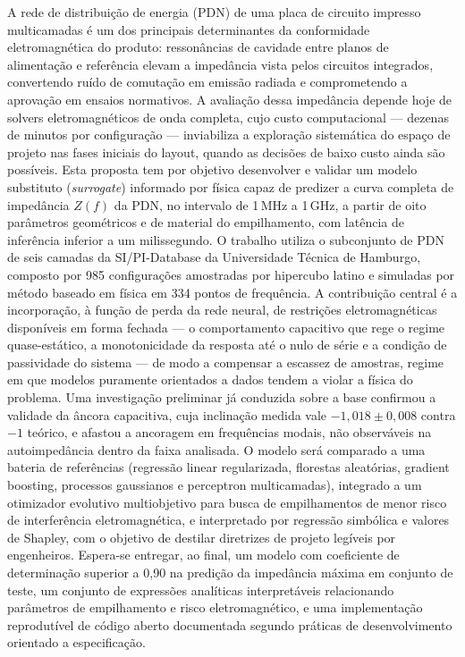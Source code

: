 \begin{resumo}

\noindent %
A rede de distribuição de energia (PDN) de uma placa de circuito impresso
multicamadas é um dos principais determinantes da conformidade eletromagnética
do produto: ressonâncias de cavidade entre planos de alimentação e referência
elevam a impedância vista pelos circuitos integrados, convertendo ruído de
comutação em emissão radiada e comprometendo a aprovação em ensaios normativos.
A avaliação dessa impedância depende hoje de solvers eletromagnéticos de onda
completa, cujo custo computacional — dezenas de minutos por configuração —
inviabiliza a exploração sistemática do espaço de projeto nas fases iniciais do
layout, quando as decisões de baixo custo ainda são possíveis. Esta proposta
tem por objetivo desenvolver e validar um modelo substituto (\textit{surrogate})
informado por física capaz de predizer a curva completa de impedância
$Z(f)$ da PDN, no intervalo de 1\,MHz a 1\,GHz, a partir de oito parâmetros
geométricos e de material do empilhamento, com latência de inferência inferior
a um milissegundo. O trabalho utiliza o subconjunto de PDN de seis camadas da
SI/PI-Database da Universidade Técnica de Hamburgo, composto por 985
configurações amostradas por hipercubo latino e simuladas por método baseado em
física em 334 pontos de frequência. A contribuição central é a incorporação, à
função de perda da rede neural, de restrições eletromagnéticas disponíveis em
forma fechada — o comportamento capacitivo que rege o regime quase-estático, a
monotonicidade da resposta até o nulo de série e a condição de passividade do
sistema — de modo a compensar a escassez de amostras, regime em que modelos
puramente orientados a dados tendem a violar a física do problema. Uma
investigação preliminar já conduzida sobre a base confirmou a validade da âncora
capacitiva, cuja inclinação medida vale $-1{,}018 \pm 0{,}008$ contra $-1$
teórico, e afastou a ancoragem em frequências modais, não observáveis na
autoimpedância dentro da faixa analisada. O modelo será comparado a uma bateria de
referências (regressão linear regularizada, florestas aleatórias, gradient
boosting, processos gaussianos e perceptron multicamadas), integrado a um
otimizador evolutivo multiobjetivo para busca de empilhamentos de menor risco
de interferência eletromagnética, e interpretado por regressão simbólica e
valores de Shapley, com o objetivo de destilar diretrizes de projeto legíveis
por engenheiros. Espera-se entregar, ao final, um modelo com coeficiente de
determinação superior a 0,90 na predição da impedância máxima em conjunto de
teste, um conjunto de expressões analíticas interpretáveis relacionando
parâmetros de empilhamento e risco eletromagnético, e uma implementação
reprodutível de código aberto documentada segundo práticas de desenvolvimento
orientado a especificação.

\end{resumo}
